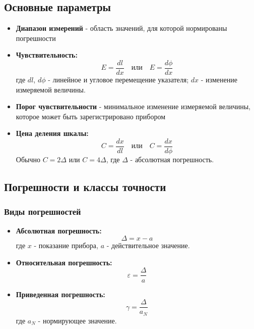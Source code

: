 \documentclass[14pt, a4paper, twoside]{extreport}
\begin{document}
\subsection{Основные параметры}
\begin{itemize}
  \item \textbf{Диапазон измерений} - область значений, для которой нормированы погрешности

  \item \textbf{Чувствительность:}
    \[
      E = \frac{dl}{dx} \quad \text{или} \quad E = \frac{d\phi}{dx}
    \]
    где $dl$, $d\phi$ - линейное и угловое перемещение указателя; $dx$ - изменение измеряемой величины.

  \item \textbf{Порог чувствительности} - минимальное изменение измеряемой величины, которое может быть зарегистрировано прибором

  \item \textbf{Цена деления шкалы:}
    \[
      C = \frac{dx}{dl} \quad \text{или} \quad C = \frac{dx}{d\phi}
    \]
    Обычно $C = 2\Delta$ или $C = 4\Delta$, где $\Delta$ - абсолютная погрешность.
\end{itemize}

\subsection{Погрешности и классы точности}

\subsubsection{Виды погрешностей}
\begin{itemize}
  \item \textbf{Абсолютная погрешность:}
    \[
      \Delta = x - a
    \]
    где $x$ - показание прибора, $a$ - действительное значение.

  \item \textbf{Относительная погрешность:}
    \[
      \varepsilon = \frac{\Delta}{a}
    \]

  \item \textbf{Приведенная погрешность:}
    \[
      \gamma = \frac{\Delta}{a_N}
    \]
    где $a_N$ - нормирующее значение.
\end{itemize}
\end{document}
